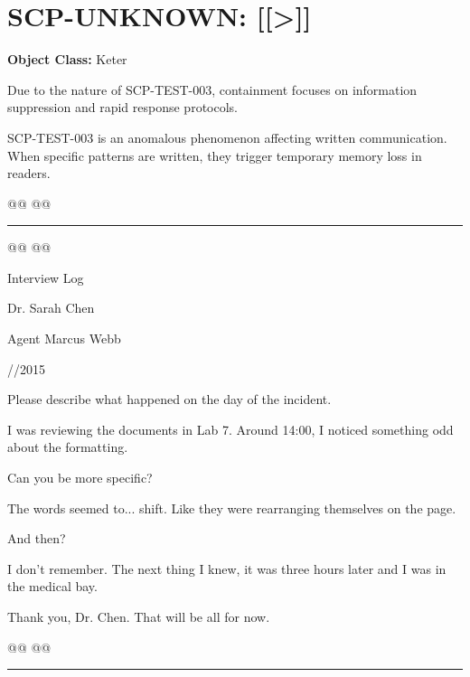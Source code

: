 \section{SCP-UNKNOWN: [[\textgreater{}]]}

\textbf{Object Class:} Keter

\containment

Due to the nature of SCP-TEST-003, containment focuses on information suppression and rapid response protocols.

\scpdescription

SCP-TEST-003 is an anomalous phenomenon affecting written communication. When specific patterns are written, they trigger temporary memory loss in readers.

@@ @@

\hrule\vspace{0.5cm}

@@ @@


Interview Log

\begin{scpdialogue}

 Dr. Sarah Chen

 Agent Marcus Webb

 \blackbox{}\blackbox{}/\blackbox{}\blackbox{}/2015

 Please describe what happened on the day of the incident.

 I was reviewing the documents in Lab 7. Around 14:00, I noticed something odd about the formatting.

 Can you be more specific?

 The words seemed to... shift. Like they were rearranging themselves on the page.

 And then?

 I don't remember. The next thing I knew, it was three hours later and I was in the medical bay.

 Thank you, Dr. Chen. That will be all for now.

\end{scpdialogue}



@@ @@

\hrule\vspace{0.5cm}

